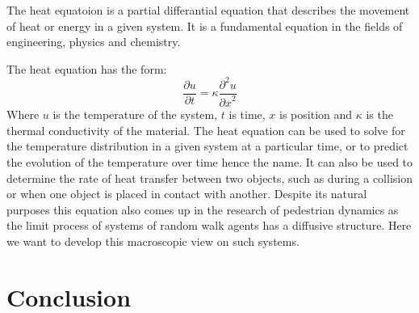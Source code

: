 The heat equatoion is a partial differantial equation that describes the movement of heat or energy in a given system.
It is a fundamental equation in the fields of engineering, physics and chemistry.

The heat equation has the form: 
\begin{equation}
\frac{\partial u}{\partial t} = \kappa \frac{{\partial}^2u}{{\partial x}^2}
\end{equation}
Where $u$ is the temperature of the system, $t$ is time, $x$ is position and $\kappa$ is the thermal conductivity of the material.
The heat equation can be used to solve for the temperature distribution in a given system at a particular time, or to predict the evolution 
of the temperature over time hence the name. It can also be used to determine the rate of heat transfer between two objects, such as during a 
collision or when one object is placed in contact with another.
Despite its natural purposes this equation also comes up in the research of pedestrian dynamics as the limit process of systems of random walk agents 
has a diffusive structure. Here we want to develop this macroscopic view on such systems.


\newpage
\section{Conclusion}


\newpage





